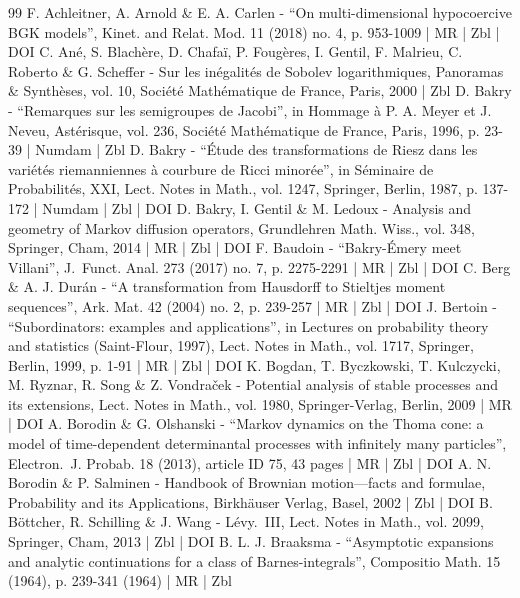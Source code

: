 \begin{thebibliography}{99}
F. Achleitner, A. Arnold \& E. A. Carlen - “On multi-dimensional hypocoercive BGK models”, Kinet. and Relat. Mod. 11 (2018) no. 4, p. 953-1009 | MR | Zbl | DOI
C. Ané, S. Blachère, D. Chafaï, P. Fougères, I. Gentil, F. Malrieu, C. Roberto \& G. Scheffer - Sur les inégalités de Sobolev logarithmiques, Panoramas \& Synthèses, vol. 10, Société Mathématique de France, Paris, 2000 | Zbl
D. Bakry - “Remarques sur les semigroupes de Jacobi”, in Hommage à P. A. Meyer et J. Neveu, Astérisque, vol. 236, Société Mathématique de France, Paris, 1996, p. 23-39 | Numdam | Zbl
D. Bakry - “Étude des transformations de Riesz dans les variétés riemanniennes à courbure de Ricci minorée”, in Séminaire de Probabilités, XXI, Lect. Notes in Math., vol. 1247, Springer, Berlin, 1987, p. 137-172 | Numdam | Zbl | DOI
D. Bakry, I. Gentil \& M. Ledoux - Analysis and geometry of Markov diffusion operators, Grundlehren Math. Wiss., vol. 348, Springer, Cham, 2014 | MR | Zbl | DOI
F. Baudoin - “Bakry-Émery meet Villani”, J. Funct. Anal. 273 (2017) no. 7, p. 2275-2291 | MR | Zbl | DOI
C. Berg \& A. J. Durán - “A transformation from Hausdorff to Stieltjes moment sequences”, Ark. Mat. 42 (2004) no. 2, p. 239-257 | MR | Zbl | DOI
J. Bertoin - “Subordinators: examples and applications”, in Lectures on probability theory and statistics (Saint-Flour, 1997), Lect. Notes in Math., vol. 1717, Springer, Berlin, 1999, p. 1-91 | MR | Zbl | DOI
K. Bogdan, T. Byczkowski, T. Kulczycki, M. Ryznar, R. Song \& Z. Vondraček - Potential analysis of stable processes and its extensions, Lect. Notes in Math., vol. 1980, Springer-Verlag, Berlin, 2009 | MR | DOI
A. Borodin \& G. Olshanski - “Markov dynamics on the Thoma cone: a model of time-dependent determinantal processes with infinitely many particles”, Electron. J. Probab. 18 (2013), article ID 75, 43 pages | MR | Zbl | DOI
A. N. Borodin \& P. Salminen - Handbook of Brownian motion—facts and formulae, Probability and its Applications, Birkhäuser Verlag, Basel, 2002 | Zbl | DOI
B. Böttcher, R. Schilling \& J. Wang - Lévy. III, Lect. Notes in Math., vol. 2099, Springer, Cham, 2013 | Zbl | DOI
B. L. J. Braaksma - “Asymptotic expansions and analytic continuations for a class of Barnes-integrals”, Compositio Math. 15 (1964), p. 239-341 (1964) | MR | Zbl

\end{thebibliography}
